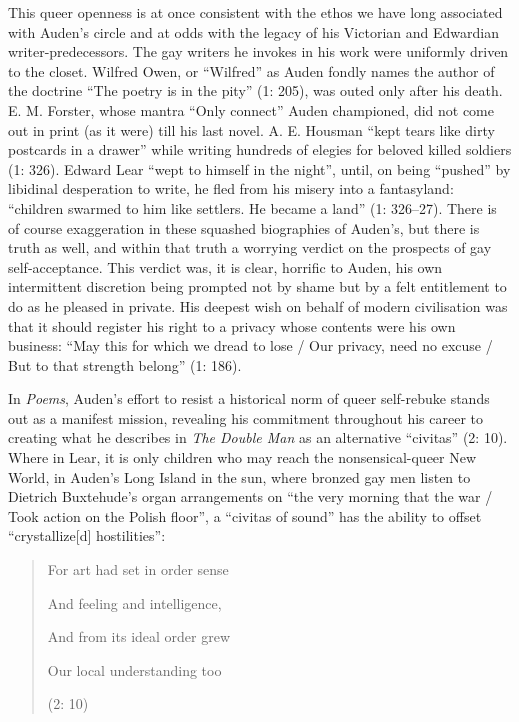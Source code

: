 \begin{review}
This queer openness is at once consistent with the ethos we have long
associated with Auden's circle and at odds with the legacy of his
Victorian and Edwardian writer-predecessors. The gay
writers he invokes in his work were uniformly driven to the closet.
Wilfred Owen, or ``Wilfred'' as Auden fondly names the author of the
doctrine ``The poetry is in the pity'' (1: 205), was outed only after
his death. E. M. Forster, whose mantra ``Only connect'' \parencite[195]{forster_howards_1991} Auden championed, did not come out in print (as it were) till his
last novel. A. E. Housman ``kept tears like dirty postcards in a
drawer'' while writing hundreds of elegies for beloved killed
soldiers (1: 326). Edward Lear ``wept to himself in the night'', until,
on being ``pushed'' by libidinal desperation to write, he fled from his
misery into a fantasyland: ``children swarmed to him like settlers. He
became a land'' (1: 326--27). There is of course exaggeration in these
squashed biographies of Auden's, but there is truth as well, and within
that truth a worrying verdict on the prospects of gay self-acceptance.
This verdict was, it is clear, horrific to Auden, his own intermittent
discretion being prompted not by shame but by a felt entitlement to do
as he pleased in private. His deepest wish on behalf of modern
civilisation was that it should register his right to a privacy whose
contents were his own business: ``May this for which we dread to lose /
Our privacy, need no excuse / But to that strength belong'' (1: 186).

In \emph{Poems}, Auden's effort to resist a historical norm of queer
self-rebuke stands out as a manifest mission, revealing his commitment
throughout his career to creating what he describes in \emph{The Double
Man} as an alternative ``civitas'' (2: 10). Where in Lear, it is only
children who may reach the nonsensical-queer New World, in Auden's Long
Island in the sun, where bronzed gay men listen to Dietrich Buxtehude's
organ arrangements on ``the very morning that the war / Took action on
the Polish floor'', a ``civitas of sound'' has the ability to offset
``crystallize{[}d{]} hostilities'':

\begin{quote}
For art had set in order sense

And feeling and intelligence,

And from its ideal order grew

Our local understanding too

\begin{flushright}
(2: 10)
\end{flushright}
\end{quote}


\end{review}
